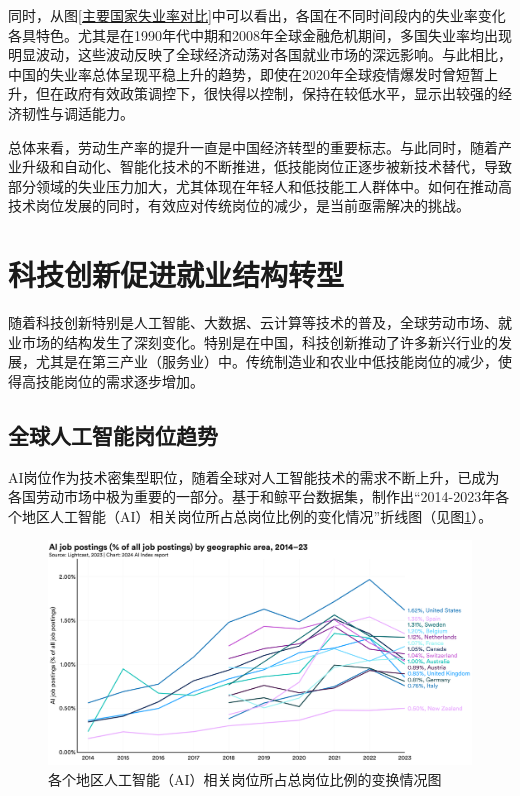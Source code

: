 同时，从图\ref{主要国家失业率对比}中可以看出，各国在不同时间段内的失业率变化各具特色。尤其是在1990年代中期和2008年全球金融危机期间，多国失业率均出现明显波动，这些波动反映了全球经济动荡对各国就业市场的深远影响。与此相比，中国的失业率总体呈现平稳上升的趋势，即使在2020年全球疫情爆发时曾短暂上升，但在政府有效政策调控下，很快得以控制，保持在较低水平，显示出较强的经济韧性与调适能力。

总体来看，劳动生产率的提升一直是中国经济转型的重要标志。与此同时，随着产业升级和自动化、智能化技术的不断推进，低技能岗位正逐步被新技术替代，导致部分领域的失业压力加大，尤其体现在年轻人和低技能工人群体中。如何在推动高技术岗位发展的同时，有效应对传统岗位的减少，是当前亟需解决的挑战。\cite{zhang2022digital}

\section{科技创新促进就业结构转型}
随着科技创新特别是人工智能、大数据、云计算等技术的普及，全球劳动市场、就业市场的结构发生了深刻变化。特别是在中国，科技创新推动了许多新兴行业的发展，尤其是在第三产业（服务业）中。传统制造业和农业中低技能岗位的减少，使得高技能岗位的需求逐步增加。

\subsection{全球人工智能岗位趋势}
AI岗位作为技术密集型职位，随着全球对人工智能技术的需求不断上升，已成为各国劳动市场中极为重要的一部分。基于和鲸平台数据集，制作出“2014-2023年各个地区人工智能（AI）相关岗位所占总岗位比例的变化情况”折线图（见图\ref{各个地区人工智能（AI）相关岗位所占总岗位比例的变换情况图}）。

\begin{figure}[H]
    \centering
    \includegraphics[width=0.7\linewidth]{figure/17各个地区人工智能（AI）相关岗位所占总岗位比例的变换情况图.png}
    \caption{各个地区人工智能（AI）相关岗位所占总岗位比例的变换情况图}
    \label{各个地区人工智能（AI）相关岗位所占总岗位比例的变换情况图}
\end{figure}

